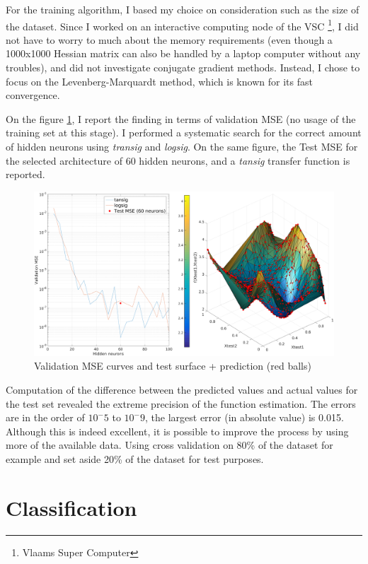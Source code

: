 \documentclass[11pt, a4paper]{article}
\begin{document}
For the training algorithm, I based my choice on consideration such as
the size of the dataset. Since I worked on an interactive computing
node of the VSC \footnote{Vlaams Super Computer}, I did not have to
worry to much about the memory requirements (even though a 1000x1000
Hessian matrix can also be handled by a laptop computer without any
troubles), and did not investigate conjugate gradient
methods. Instead, I chose to focus on the Levenberg-Marquardt method,
which is known for its fast convergence.

On the figure \ref{fig:test_mse_error}, I report the finding in terms
of validation MSE (no usage of the training set at this stage). I
performed a systematic search for the correct amount of hidden neurons
using \emph{transig} and \emph{logsig}. On the same figure, the Test
MSE for the selected architecture of 60 hidden neurons, and a
\emph{tansig} transfer function is reported.

\begin{figure}[H]
  \centering
  \includegraphics[scale=0.34]{regression_logtan_error.pdf}
  \caption{Validation MSE curves and test surface + prediction (red balls)}
  \label{fig:test_mse_error}
\end{figure}

Computation of the difference between the predicted values and actual
values for the test set revealed the extreme precision of the function
estimation. The errors are in the order of $10^-5$ to $10^-9$, the
largest error (in absolute value) is 0.015. Although this is indeed
excellent, it is possible to improve the process by using more of the
available data. Using cross validation on 80\% of the dataset for
example and set aside 20\% of the dataset for test purposes. 

\section{Classification}
\end{document}
